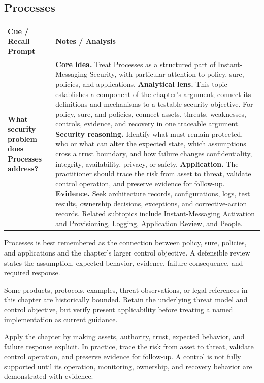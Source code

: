 \documentclass[11pt]{article}
\newcommand{\CornellHeader}{%
\rowcolor{Navy}\color{white}\bfseries Cue / Recall Prompt & \color{white}\bfseries Notes / Analysis\\\hline}
\newcommand{\CornellRow}[2]{%
\cellcolor{CueGray}\RaggedRight\textbf{#1} & \RaggedRight #2\\\hline}
\begin{document}
\subsection*{Processes}
\begin{longtable}{>{\RaggedRight\arraybackslash}p{}|>{\RaggedRight\arraybackslash}p{}}
\CornellHeader
\CornellRow{What security problem does Processes address?}{\textbf{Core idea.} Treat Processes as a structured part of Instant-Messaging Security, with particular attention to policy, sure, policies, and applications. \textbf{Analytical lens.} This topic establishes a component of the chapter's argument; connect its definitions and mechanisms to a testable security objective. For policy, sure, and policies, connect assets, threats, weaknesses, controls, evidence, and recovery in one traceable argument. \textbf{Security reasoning.} Identify what must remain protected, who or what can alter the expected state, which assumptions cross a trust boundary, and how failure changes confidentiality, integrity, availability, privacy, or safety. \textbf{Application.} The practitioner should trace the risk from asset to threat, validate control operation, and preserve evidence for follow-up. \textbf{Evidence.} Seek architecture records, configurations, logs, test results, ownership decisions, exceptions, and corrective-action records. Related subtopics include Instant-Messaging Activation and Provisioning, Logging, Application Review, and People.}
\end{longtable}
\begin{topicsummary}
Processes is best remembered as the connection between policy, sure, policies, and applications and the chapter's larger control objective. A defensible review states the assumption, expected behavior, evidence, failure consequence, and required response.
\end{topicsummary}
\begin{historybox}
Some products, protocols, examples, threat observations, or legal references in this chapter are historically bounded. Retain the underlying threat model and control objective, but verify present applicability before treating a named implementation as current guidance.
\end{historybox}
\begin{defensebox}
Apply the chapter by making assets, authority, trust, expected behavior, and failure response explicit. In practice, trace the risk from asset to threat, validate control operation, and preserve evidence for follow-up. A control is not fully supported until its operation, monitoring, ownership, and recovery behavior are demonstrated with evidence.
\end{defensebox}
\end{document}
